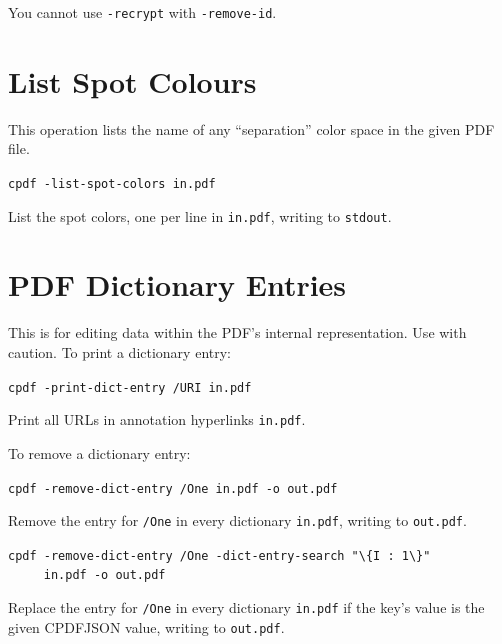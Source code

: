 \documentclass{book}
\begin{document}
\noindent You cannot use \texttt{-recrypt} with \texttt{-remove-id}.

\section{List Spot Colours}
This operation lists the name of any ``separation'' color space in the given PDF file.

  \begin{framed}
  \small\noindent\verb!cpdf -list-spot-colors in.pdf!

  \vspace{2.5mm}
  \noindent List the spot colors, one per line in \texttt{in.pdf}, writing to \texttt{stdout}.
  \end{framed}

\section{PDF Dictionary Entries}
\label{removedictentry}
This is for editing data within the PDF's internal representation. Use with caution.
To print a dictionary entry:

  \begin{framed}
  \small\noindent\verb!cpdf -print-dict-entry /URI in.pdf!

  \vspace{2.5mm}
  \noindent Print all URLs in annotation hyperlinks \texttt{in.pdf}. 
  \end{framed}

\noindent To remove a dictionary entry:

  \begin{framed}
  \small\noindent\verb!cpdf -remove-dict-entry /One in.pdf -o out.pdf!

  \vspace{2.5mm}
  \noindent Remove the entry for \texttt{/One} in every dictionary \texttt{in.pdf}, writing to \texttt{out.pdf}. 

  \vspace{2.5mm}

  \small\noindent\verb!cpdf -remove-dict-entry /One -dict-entry-search "\{I : 1\}"!\\
  \small\noindent\verb!     in.pdf -o out.pdf!

  \vspace{2.5mm}
  \noindent Replace the entry for \texttt{/One} in every dictionary \texttt{in.pdf} if the key's value is the given CPDFJSON value, writing to \texttt{out.pdf}. 
  \end{framed}
\end{document}
